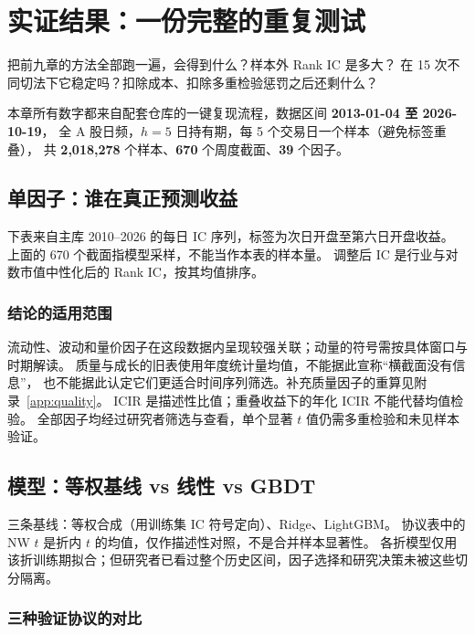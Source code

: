 \chapter{实证结果：一份完整的重复测试}\label{ch:result}

\begin{keybox}[本章要回答的问题]
把前九章的方法全部跑一遍，会得到什么？样本外 Rank IC 是多大？
在 15 次不同切法下它稳定吗？扣除成本、扣除多重检验惩罚之后还剩什么？
\end{keybox}

本章所有数字都来自配套仓库的一键复现流程，数据区间 \textbf{2013-01-04 至 2026-10-19}，
全 A 股日频，$h=5$ 日持有期，每 5 个交易日一个样本（避免标签重叠），
共 \textbf{2,018,278} 个样本、\textbf{670} 个周度截面、\textbf{39} 个因子。

\section{单因子：谁在真正预测收益}

下表来自主库 2010--2026 的每日 IC 序列，标签为次日开盘至第六日开盘收益。
上面的 670 个截面指模型采样，不能当作本表的样本量。
调整后 IC 是行业与对数市值中性化后的 Rank IC，按其均值排序。



\subsection{结论的适用范围}
流动性、波动和量价因子在这段数据内呈现较强关联；动量的符号需按具体窗口与时期解读。
质量与成长的旧表使用年度统计量均值，不能据此宣称“横截面没有信息”，
也不能据此认定它们更适合时间序列筛选。补充质量因子的重算见附录~\ref{app:quality}。
ICIR 是描述性比值；重叠收益下的年化 ICIR 不能代替均值检验。
全部因子均经过研究者筛选与查看，单个显著 $t$ 值仍需多重检验和未见样本验证。

\section{模型：等权基线 vs 线性 vs GBDT}

三条基线：等权合成（用训练集 IC 符号定向）、Ridge、LightGBM。
协议表中的 NW $t$ 是折内 $t$ 的均值，仅作描述性对照，不是合并样本显著性。
各折模型仅用该折训练期拟合；但研究者已看过整个历史区间，因子选择和研究决策未被这些切分隔离。

\subsection{三种验证协议的对比}

